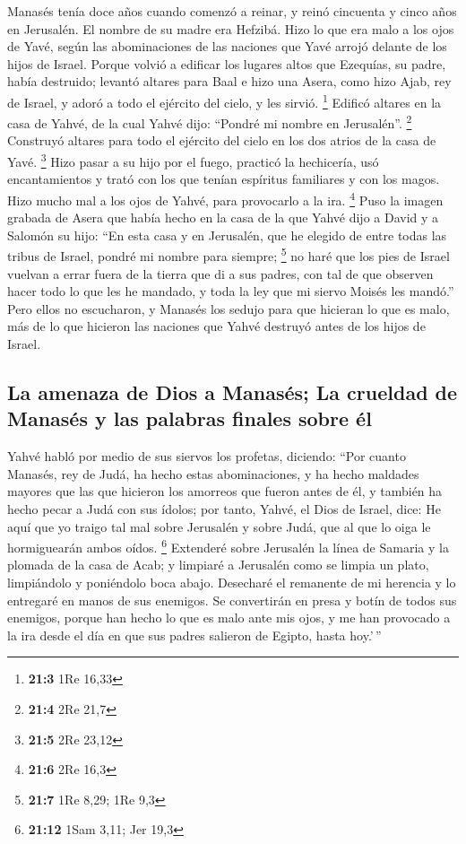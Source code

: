 \begin{paracol}{2}
 Manasés tenía doce años cuando comenzó a reinar, y reinó
cincuenta y cinco años en Jerusalén. El nombre de su madre era Hefzibá.
 Hizo lo que era malo a los ojos de Yavé, según las
abominaciones de las naciones que Yavé arrojó delante de los hijos de
Israel.  Porque volvió a edificar los lugares altos que
Ezequías, su padre, había destruido; levantó altares para Baal e hizo
una Asera, como hizo Ajab, rey de Israel, y adoró a todo el ejército del
cielo, y les sirvió. \footnote{\textbf{21:3} 1Re 16,33} 
Edificó altares en la casa de Yahvé, de la cual Yahvé dijo: ``Pondré mi
nombre en Jerusalén''. \footnote{\textbf{21:4} 2Re 21,7} 
Construyó altares para todo el ejército del cielo en los dos atrios de
la casa de Yavé. \footnote{\textbf{21:5} 2Re 23,12}  Hizo
pasar a su hijo por el fuego, practicó la hechicería, usó encantamientos
y trató con los que tenían espíritus familiares y con los magos. Hizo
mucho mal a los ojos de Yahvé, para provocarlo a la ira. \footnote{\textbf{21:6}
  2Re 16,3}  Puso la imagen grabada de Asera que había
hecho en la casa de la que Yahvé dijo a David y a Salomón su hijo: ``En
esta casa y en Jerusalén, que he elegido de entre todas las tribus de
Israel, pondré mi nombre para siempre; \footnote{\textbf{21:7} 1Re 8,29;
  1Re 9,3}  no haré que los pies de Israel vuelvan a errar
fuera de la tierra que di a sus padres, con tal de que observen hacer
todo lo que les he mandado, y toda la ley que mi siervo Moisés les
mandó.''  Pero ellos no escucharon, y Manasés los sedujo
para que hicieran lo que es malo, más de lo que hicieron las naciones
que Yahvé destruyó antes de los hijos de Israel.

\hypertarget{la-amenaza-de-dios-a-manasuxe9s-la-crueldad-de-manasuxe9s-y-las-palabras-finales-sobre-uxe9l}{%
\subsection{La amenaza de Dios a Manasés; La crueldad de Manasés y las
palabras finales sobre
él}\label{la-amenaza-de-dios-a-manasuxe9s-la-crueldad-de-manasuxe9s-y-las-palabras-finales-sobre-uxe9l}}

 Yahvé habló por medio de sus siervos los profetas,
diciendo:  ``Por cuanto Manasés, rey de Judá, ha hecho
estas abominaciones, y ha hecho maldades mayores que las que hicieron
los amorreos que fueron antes de él, y también ha hecho pecar a Judá con
sus ídolos;  por tanto, Yahvé, el Dios de Israel, dice:
He aquí que yo traigo tal mal sobre Jerusalén y sobre Judá, que al que
lo oiga le hormiguearán ambos oídos. \footnote{\textbf{21:12} 1Sam 3,11;
  Jer 19,3}  Extenderé sobre Jerusalén la línea de
Samaria y la plomada de la casa de Acab; y limpiaré a Jerusalén como se
limpia un plato, limpiándolo y poniéndolo boca abajo. 
Desecharé el remanente de mi herencia y lo entregaré en manos de sus
enemigos. Se convertirán en presa y botín de todos sus enemigos,
 porque han hecho lo que es malo ante mis ojos, y me han
provocado a la ira desde el día en que sus padres salieron de Egipto,
hasta hoy.'\,''


\end{paracol}
